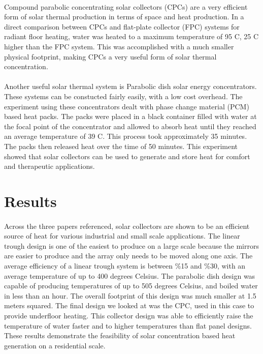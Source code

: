 \documentclass{article}
\begin{document}
    \paragraph{}
    Compound parabolic concentrating solar collectors (CPCs) are a very efficient form of solar thermal production in terms of space
    and heat production. In a direct comparison between CPCs and flat-plate collector (FPC) systems for radiant floor heating, water was
    heated to a maximum temperature of 95 \degree C, 25 \degree C higher than the FPC system.  This was accomplished with a much 
    smaller physical footprint, making CPCs a very useful form of solar thermal concentration.\cite{CPCs-vs-FPCs}
    
    \paragraph{}
    Another useful solar thermal system is Parabolic dish solar energy concentrators.  These systems can be constucted fairly easily,
    with a low cost overhead.
    The experiment using these concentrators dealt with phase change material (PCM) based 
    heat packs. The packs were placed in a black container filled with water at the focal point of the concentrator and allowed to absorb heat
    until they reached an average temperature of 39 \degree C. This process took approximately 35 minutes. 
    The packs then released heat over the time of 50 minutes. 
    This experiment showed that solar collectors can be used to generate and store heat for comfort and therapeutic applications.\cite{doi:10.1063/1.4949125}
    
\section{Results}
    \paragraph{}
    Across the three papers referenced, solar collectors are shown to be an efficient source of heat for various 
    industrial and small scale applications.  The linear trough design is one of the easiest to produce on a large scale 
    because the mirrors are easier to produce and the array only needs to be moved along one axis.  The average efficiency 
    of a linear trough system is between \%15 and \%30, with an average temperature of up to 400 degrees Celsius\cite{Basking-in-the-Sun}.  The parabolic 
    dish design was capable of producing temperatures of up to 505 degrees Celsius, and boiled water in less than an hour.  
    The overall footprint of this design was much smaller at 1.5 meters squared\cite{doi:10.1063/1.4949125}.  The final design we looked at was the CPC, 
    used in this case to provide underfloor heating.  This collector design was able to efficiently raise the temperature of 
    water faster and to higher temperatures than flat panel designs.  These results demonstrate the feasibility of solar 
    concentration based heat generation on a residential scale.

    \printbibliography
\end{document}

